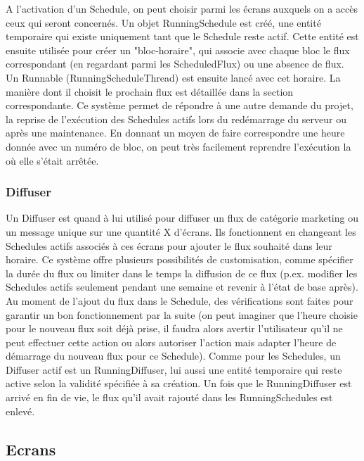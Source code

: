 \documentclass[french]{article}
\begin{document}
A l'activation d'un Schedule, on peut choisir parmi les écrans auxquels on a accès ceux qui seront concernés. Un objet RunningSchedule est créé, une entité temporaire qui existe uniquement tant que le Schedule reste actif. 
Cette entité est ensuite utilisée pour créer un "bloc-horaire", qui associe avec chaque bloc le flux correspondant (en regardant parmi les ScheduledFlux) ou une absence de flux. Un Runnable (RunningScheduleThread) est ensuite lancé avec cet horaire. La manière dont il choisit le prochain flux est détaillée dans la section correspondante.\newline 
Ce système permet de répondre à une autre demande du projet, la reprise de l'exécution des Schedules actifs lors du redémarrage du serveur ou après une maintenance. En donnant un moyen de faire correspondre une heure donnée avec un numéro de bloc, on peut très facilement reprendre l'exécution la où elle s'était arrêtée.


\subsubsection{Diffuser}
Un Diffuser est quand à lui utilisé pour diffuser un flux de catégorie marketing ou un message unique sur une quantité X d'écrans. Ils fonctionnent en changeant les Schedules actifs associés à ces écrans pour ajouter le flux souhaité dans leur horaire. Ce système offre plusieurs possibilités de customisation, comme spécifier la durée du flux ou limiter dans le temps la diffusion de ce flux (p.ex. modifier les Schedules actifs seulement pendant une semaine et revenir à l'état de base après). Au moment de l'ajout du flux dans le Schedule, des vérifications sont faites pour garantir un bon fonctionnement par la suite (on peut imaginer que l'heure choisie pour le nouveau flux soit déjà prise, il faudra alors avertir l'utilisateur qu'il ne peut effectuer cette action ou alors autoriser l'action mais adapter l'heure de démarrage du nouveau flux pour ce Schedule). \newline
Comme pour les Schedules, un Diffuser actif est un RunningDiffuser, lui aussi une entité temporaire qui reste active selon la validité spécifiée à sa création. Un fois que le RunningDiffuser est arrivé en fin de vie, le flux qu'il avait rajouté dans les RunningSchedules est enlevé. 


\subsection{Ecrans}
\end{document}
